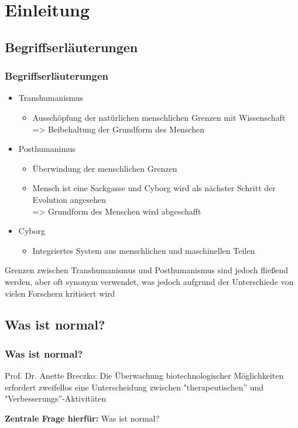 \documentclass[aspectratio=169,16pt,xcolor=table]{beamer}
\begin{document}
\section{Einleitung}
\subsection{Begriffserläuterungen}
\begin{frame}
	\frametitle{Begriffserläuterungen}
	\begin{itemize}
	  \item Transhumanismus
    \begin{itemize}
      \item Ausschöpfung der natürlichen menschlichen Grenzen mit Wissenschaft~\cite{Merzlyakov2022}\\
      => Beibehaltung der Grundform des Menschen
    \end{itemize}
	\item Posthumanimus
    \begin{itemize}
      \item Überwindung der menschlichen Grenzen~\cite{Merzlyakov2022}\\
      \item Mensch ist eine Sackgasse und Cyborg wird als nächster Schritt der Evolution angesehen~\cite{Merzlyakov2022}\\
      => Grundform des Menschen wird abgeschafft
    \end{itemize}
    \item Cyborg
    \begin{itemize}
      \item Integriertes System aus menschlichen und maschinellen Teilen~\cite{warwick2000cyborg}
    \end{itemize}
	\end{itemize}
  \scriptsize Grenzen zwischen Transhumanismus und Posthumanismus sind jedoch fließend werden, aber oft synonym verwendet, was jedoch aufgrund der Unterschiede von vielen Forschern kritisiert wird~\cite{Merzlyakov2022}
\end{frame}

\subsection{Was ist normal?}
\begin{frame}
  \frametitle{Was ist normal?}
  Prof. Dr. Anette Breczko: Die Überwachung biotechnologischer Möglichkeiten erfordert zweifellos eine Unterscheidung zwischen "therapeutischen'' und "Verbesserungs''-Aktivitäten~\cite{breczko2021human}
  
  \vspace{12pt}
  \textbf{Zentrale Frage hierfür:} Was ist normal? 
\end{frame}
\end{document}
